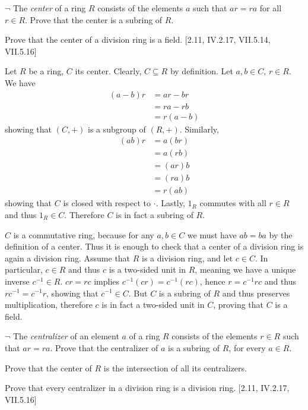 \begin{problem}
	$\neg$ The \emph{center} of a ring $R$ consists of the elements $a$ such that $ar = ra$ for all $r \in R$. Prove that the center is a subring of $R$.
	
	Prove that the center of a division ring is a field. [2.11, IV.2.17, VII.5.14, VII.5.16]
\end{problem}

\begin{solution}
	Let $R$ be a ring, $C$ its center. Clearly, $C \subseteq R$ by definition. Let $a, b \in C$, $r \in R$. We have
	\begin{align*}
		(a - b)r &= ar - br \\
		&= ra - rb \\
		&= r(a - b)
	\end{align*}
	showing that $(C, +)$ is a subgroup of $(R, +)$. Similarly,
	\begin{align*}
		(ab)r &= a(br) \\
		&= a(rb) \\
		&= (ar)b \\
		&= (ra)b \\
		&= r(ab)
	\end{align*}
	showing that $C$ is closed with respect to $\cdot$. Lastly, $1_R$ commutes with all $r \in R$ and thus $1_R \in C$. Therefore $C$ is in fact a subring of $R$.
	
	$C$ is a commutative ring, because for any $a, b \in C$ we must have $ab = ba$ by the definition of a center. Thus it is enough to check that a center of a division ring is again a division ring. Assume that $R$ is a division ring, and let $c \in C$. In particular, $c \in R$ and thus $c$ is a two-sided unit in $R$, meaning we have a unique inverse $c^{-1} \in R$. $cr = rc$ implies $c^{-1}(cr) = c^{-1}(rc)$, hence $r = c^{-1}rc$ and thus $rc^{-1} = c^{-1}r$, showing that $c^{-1} \in C$. But $C$ is a subring of $R$ and thus preserves multiplication, therefore $c$ is in fact a two-sided unit in $C$, proving that $C$ is a field.
\end{solution}

\begin{problem}
	$\neg$ The \emph{centralizer} of an element $a$ of a ring $R$ consists of the elements $r \in R$ such that $ar = ra$. Prove that the centralizer of $a$ is a subring of $R$, for every $a \in R$.
	
	Prove that the center of $R$ is the intersection of all its centralizers.
	
	Prove that every centralizer in a division ring is a division ring. [2.11, IV.2.17, VII.5.16]
\end{problem}

